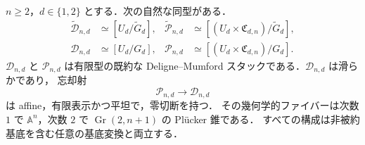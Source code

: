 \begin{theorem}
\label{thm:poisson-moduli}
$n\geq2$，$d\in\{1,2\}$ とする．次の自然な同型がある．
\begin{align}
 \widetilde{\mathcal D}_{n,d}&\simeq[U_d/\widetilde G_d],&
 \widetilde{\mathcal P}_{n,d}&\simeq[(U_d\times \mathfrak C_{d,n})/\widetilde G_d],
 \label{eq:unrigidified-moduli}\\
 \mathcal D_{n,d}&\simeq[U_d/G_d],&
 \mathcal P_{n,d}&\simeq[(U_d\times \mathfrak C_{d,n})/G_d].
 \label{eq:poisson-moduli-quotient}
\end{align}
$\mathcal D_{n,d}$ と $\mathcal P_{n,d}$ は有限型の既約な
Deligne--Mumford スタックである．$\mathcal D_{n,d}$ は滑らかであり，
忘却射
\begin{equation}
 \mathcal P_{n,d}\longrightarrow\mathcal D_{n,d}
 \label{eq:poisson-forgetful}
\end{equation}
は affine，有限表示かつ平坦で，零切断を持つ．
その幾何学的ファイバーは次数 $1$ で $\mathbb A^n$，次数 $2$ で
$\operatorname{Gr}(2,n+1)$ の Pl\"ucker 錐である．
すべての構成は非被約基底を含む任意の基底変換と両立する．
\end{theorem}

